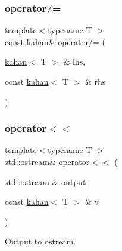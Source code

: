 \mbox{\label{struct_space_h_1_1kahan_a3092bcb332eb3a793d58e34a8a82ff1e}} 
\subsubsection{\texorpdfstring{operator/=}{operator/=}}
{\footnotesize\ttfamily template$<$typename T $>$ \\
const \mbox{\hyperlink{struct_space_h_1_1kahan}{kahan}}\& operator/= (\begin{DoxyParamCaption}\item[{\mbox{\hyperlink{struct_space_h_1_1kahan}{kahan}}$<$ T $>$ \&}]{lhs,  }\item[{const \mbox{\hyperlink{struct_space_h_1_1kahan}{kahan}}$<$ T $>$ \&}]{rhs }\end{DoxyParamCaption})\hspace{0.3cm}{\ttfamily [friend]}}

\mbox{\label{struct_space_h_1_1kahan_a5f74f934a96e15e37de4023571d648a6}} 
\subsubsection{\texorpdfstring{operator$<$$<$}{operator<<}}
{\footnotesize\ttfamily template$<$typename T $>$ \\
std\+::ostream\& operator$<$$<$ (\begin{DoxyParamCaption}\item[{std\+::ostream \&}]{output,  }\item[{const \mbox{\hyperlink{struct_space_h_1_1kahan}{kahan}}$<$ T $>$ \&}]{v }\end{DoxyParamCaption})\hspace{0.3cm}{\ttfamily [friend]}}



Output to ostream. 

\mbox{\label{struct_space_h_1_1kahan_a53c2b4bd3238b250075cb76fa4548f19}} 
